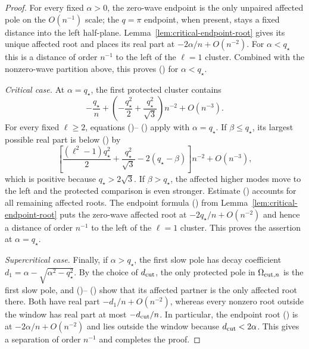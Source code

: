 \documentclass[twoside,10pt]{article}
\numberwithin{equation}{section}
\theoremstyle{slbody}
\theoremstyle{definition}
\theoremstyle{remark}
\renewcommand{\eqref}[1]{%
  \textup{{\normalfont(\oldstylenums{\ref{#1}}}\normalfont)}}
\begin{document}
\begin{proof}
For every fixed $\alpha>0$, the zero-wave endpoint is the only unpaired
affected pole on the $O(n^{-1})$ scale; the $q=\pi$ endpoint, when
present, stays a fixed distance into the left half-plane.
Lemma~\ref{lem:critical-endpoint-root} gives its unique affected root and
places its real part at $-2\alpha/n+O(n^{-2})$.  For $\alpha<q_\star$ this is
a distance of order $n^{-1}$ to the left of the $\ell=1$ cluster.  Combined
with the nonzero-wave partition above, this proves
\eqref{eq:critical-exhaustion-separation} for $\alpha<q_\star$.

\smallskip
\noindent\emph{Critical case.}
At $\alpha=q_\star$, the first protected cluster contains
\begin{equation}\label{eq:critical-protected-reference}
 -\frac{q_\star}{n}
 +\left(-\frac{q_\star^2}{2}+\frac{q_\star^2}{\sqrt3}\right)n^{-2}
 +O(n^{-3}).
\end{equation}
For every fixed $\ell\ge2$, equations
\eqref{eq:critical-uniform-simple-shift}--
\eqref{eq:critical-residue-real-half} apply with $\alpha=q_\star$.  If
$\beta\le q_\star$, its largest possible real part is below
\eqref{eq:critical-protected-reference} by
\[
 \left[\frac{(\ell^2-1)q_\star^2}{2}
       +\frac{q_\star^2}{\sqrt3}-2(q_\star-\beta)\right]n^{-2}
 +O(n^{-3}),
\]
which is positive because $q_\star>2\sqrt3$.  If $\beta>q_\star$, the affected
higher modes move to the left and the protected comparison is even
stronger.  Estimate \eqref{eq:critical-secular-exclusion} accounts for
all remaining affected roots.  The endpoint formula
\eqref{eq:critical-endpoint-root} from
Lemma~\ref{lem:critical-endpoint-root} puts the zero-wave affected root
at $-2q_\star/n+O(n^{-2})$ and
hence a distance of order $n^{-1}$ to the left of the $\ell=1$ cluster.
This proves the assertion at $\alpha=q_\star$.

\smallskip
\noindent\emph{Supercritical case.}
Finally, if $\alpha>q_\star$, the first slow pole has decay coefficient
$d_1=\alpha-\sqrt{\alpha^2-q_\star^2}$.  By the choice of
$d_{\rm cut}$, the only protected pole in $\Omega_{{\rm cut},n}$ is the
first slow pole, and
\eqref{eq:critical-secular-exclusion}--
\eqref{eq:critical-uniform-simple-shift} show that its affected partner
is the only affected root there.  Both have real part
$-d_1/n+O(n^{-2})$, whereas every nonzero root outside the window has
real part at most $-d_{\rm cut}/n$.  In particular, the endpoint root
\eqref{eq:critical-endpoint-root} is at $-2\alpha/n+O(n^{-2})$ and lies
outside the window because $d_{\rm cut}<2\alpha$.  This gives a
separation of order
$n^{-1}$ and completes the proof.
\end{proof}
\end{document}
